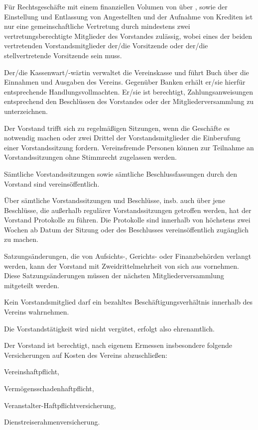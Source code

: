 \documentclass[draft]{scrartcl}
\begin{document}
\begin{contract}
Für Rechtsgeschäfte mit einem 
finanziellen Volumen von über , sowie der Einstellung und Entlassung von 
Angestellten und der Aufnahme von Krediten ist nur eine gemeinschaftliche Vertretung 
durch mindestens zwei vertretungsberechtigte Mitglieder des Vorstandes zulässig, wobei 
eines der beiden vertretenden Vorstandsmitglieder der/die Vorsitzende oder der/die 
stellvertretende Vorsitzende sein muss.

Der/die Kassenwart/-wärtin verwaltet die Vereinskasse und führt Buch über die
Einnahmen und Ausgaben des Vereins. Gegenüber Banken erhält er/sie hierfür
entsprechende Handlungsvollmachten. Er/sie ist berechtigt, Zahlungsanweisungen
entsprechend den Beschlüssen des Vorstandes oder der Mitgliederversammlung zu
unterzeichnen.


Der Vorstand trifft sich zu regelmäßigen Sitzungen, wenn die Geschäfte es
notwendig machen oder zwei Drittel der Vorstandsmitglieder die Einberufung
einer Vorstandssitzung fordern. Vereinsfremde Personen können zur Teilnahme
an Vorstandssitzungen ohne Stimmrecht zugelassen werden.

Sämtliche Vorstandssitzungen sowie sämtliche Beschlussfassungen durch
den Vorstand sind vereinsöffentlich.

Über sämtliche Vorstandssitzungen und Beschlüsse, insb. auch über jene
Beschlüsse, die außerhalb regulärer Vorstandssitzungen getroffen werden, hat
der Vorstand Protokolle zu führen. Die Protokolle sind innerhalb von höchstens
zwei Wochen ab Datum der Sitzung oder des Beschlusses vereinsöffentlich
zu\-gäng\-lich zu machen.


Satzungsänderungen, die von Aufsichts-, Gerichts- oder Finanzbehörden verlangt
werden, kann der Vorstand mit Zweidrittelmehrheit von sich aus vornehmen.
Diese Satzungsänderungen müssen der nächsten Mitgliederversammlung mitgeteilt
werden.


Kein Vorstandsmitglied darf ein bezahltes Beschäftigungsverhältnis innerhalb
des Vereins wahrnehmen.

Die Vorstandstätigkeit wird nicht vergütet, erfolgt also ehrenamtlich.


Der Vorstand ist berechtigt, nach eigenem Ermessen insbesondere folgende
Versicherungen auf Kosten des Vereins abzuschließen:
\begin{compactenum}[\hspace{2em}1.]
  \item Vereinshaftpflicht,
  \item Vermögensschadenhaftpflicht,
  \item Veranstalter-Haftpflichtversicherung,
  \item Dienstreiserahmenversicherung.
\end{compactenum}


\end{contract}
\end{document}
